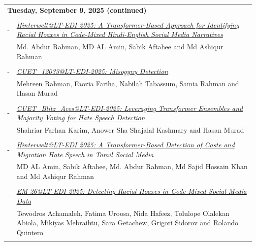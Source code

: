 \documentclass[11pt,oneside]{book}
\begin{document}
    \newpage
          \begin{tabular}{p{24mm}p{124mm}}
    \multicolumn{2}{l}{\bf Tuesday, September 9, 2025 (continued)} \\\\
          
                       -  & \hyperlink{page.121}{\emph{Hinterwelt@LT-EDI 2025: A Transformer-Based Approach for Identifying Racial Hoaxes in Code-Mixed Hindi-English Social Media Narratives}}\\
        & Md. Abdur Rahman\index{Rahman}, MD AL Amin\index{Amin}, Sabik Aftahee\index{Aftahee} and Md Ashiqur Rahman\index{Rahman}\\\\
                
                       -  & \hyperlink{page.127}{\emph{CUET\_12033@LT-EDI-2025: Misogyny Detection}}\\
        & Mehreen Rahman\index{Rahman}, Faozia Fariha\index{Fariha}, Nabilah Tabassum\index{Tabassum}, Samia Rahman\index{Rahman} and Hasan Murad\index{Murad}\\\\
                
                       -  & \hyperlink{page.133}{\emph{CUET\_Blitz\_Aces@LT-EDI-2025: Leveraging Transformer Ensembles and Majority Voting for Hate Speech Detection}}\\
        & Shahriar Farhan Karim\index{Karim}, Anower Sha Shajalal Kashmary\index{Kashmary} and Hasan Murad\index{Murad}\\\\
                
                       -  & \hyperlink{page.140}{\emph{Hinterwelt@LT-EDI 2025: A Transformer-Based Detection of Caste and Migration Hate Speech in Tamil Social Media}}\\
        & MD AL Amin\index{Amin}, Sabik Aftahee\index{Aftahee}, Md. Abdur Rahman\index{Rahman}, Md Sajid Hossain Khan\index{Khan} and Md Ashiqur Rahman\index{Rahman}\\\\
                
                       -  & \hyperlink{page.146}{\emph{EM-26@LT-EDI 2025: Detecting Racial Hoaxes in Code-Mixed Social Media Data}}\\
        & Tewodros Achamaleh\index{Achamaleh}, Fatima Uroosa\index{Uroosa}, Nida Hafeez\index{Hafeez}, Tolulope Olalekan Abiola\index{Abiola}, Mikiyas Mebraihtu\index{Mebraihtu}, Sara Getachew\index{Getachew}, Grigori Sidorov\index{Sidorov} and Rolando Quintero\index{Quintero}\\\\
                

\end{tabular}
\end{document}
